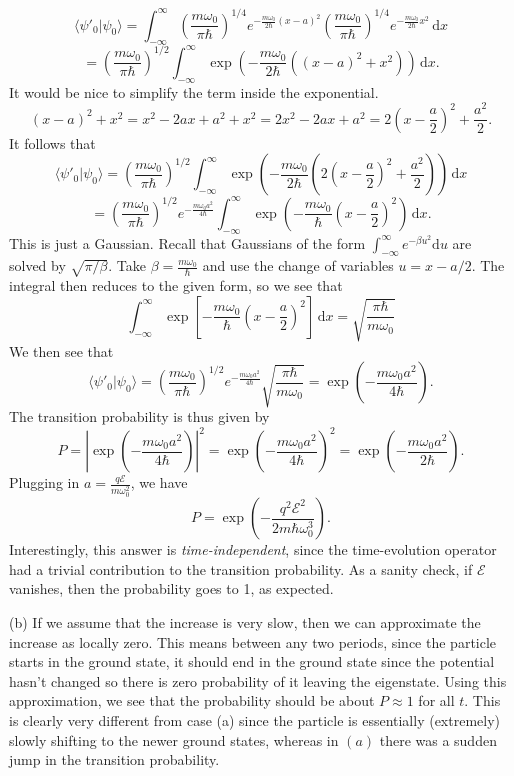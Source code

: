 \documentclass[11pt, letterpaper]{article}
\begin{document}
$$\langle \psi'_0 | \psi_0 \rangle = \int_{-\infty}^{\infty} \left(\frac{m\omega_0}{\pi\hbar}\right)^{1/4} e^{-\frac{m\omega_0}{2\hbar}(x-a)^2} \left(\frac{m\omega_0}{\pi\hbar}\right)^{1/4} e^{-\frac{m\omega_0}{2\hbar}x^2} \, \mathrm{d} x$$
$$= \left(\frac{m\omega_0}{\pi\hbar}\right)^{1/2} \int_{-\infty}^{\infty} \exp\left(-\frac{m\omega_0}{2\hbar}((x-a)^2 + x^2)\right) \, \mathrm{d} x . $$
It would be nice to simplify the term inside the exponential.
$$ (x-a)^2 + x^2 = x^2 - 2ax + a^2 + x^2 = 2x^2 - 2ax + a^2= 2\left(x - \frac{a}{2}\right)^2 + \frac{a^2}{2} .$$
It follows that
$$ \langle \psi '_0 | \psi_0 \rangle = \left(\frac{m\omega_0}{\pi\hbar}\right)^{1/2} \int_{-\infty}^{\infty} \exp\left(-\frac{m\omega_0}{2\hbar}\left(2\left(x - \frac{a}{2}\right)^2 + \frac{a^2}{2}\right)\right) \, \mathrm{d} x $$
$$= \left(\frac{m\omega_0}{\pi\hbar}\right)^{1/2} e^{-\frac{m\omega_0 a^2}{4\hbar}} \int_{-\infty}^{\infty} \exp\left(-\frac{m\omega_0}{\hbar}\left(x - \frac{a}{2}\right)^2\right) \, \mathrm{d} x  .$$
This is just a Gaussian. Recall that Gaussians of the form $\int_{-\infty}^{\infty} e^{-\beta u^2} \mathrm{d} u$ are solved by $\sqrt{\pi/\beta}$. Take $\beta = \frac{m\omega_0}{\hbar}$ and use the change of variables $u = x - a/2$. The integral then reduces to the given form, so we see that
$$ \int_{-\infty}^{\infty} \exp\left[-\frac{m\omega_0}{\hbar}\left(x - \frac{a}{2}\right)^2\right] \, \mathrm{d} x = \sqrt{\frac{\pi\hbar}{m\omega_0}} $$
We then see that
$$ \langle \psi '_0 | \psi_0 \rangle = \left(\frac{m\omega_0}{\pi\hbar}\right)^{1/2} e^{-\frac{m\omega_0 a^2}{4\hbar}} \sqrt{\frac{\pi\hbar}{m\omega_0}} = \exp\left(-\frac{m\omega_0 a^2}{4\hbar}\right).$$
The transition probability is thus given by
\[
	P=\left| \exp \left( -\frac{m\omega _0a^2}{4\hbar}  \right)  \right| ^2=\exp \left( -\frac{m\omega _0a^2}{4\hbar}  \right) ^2=\exp \left( -\frac{m\omega _0a^2}{2\hbar}  \right) 
.\]
Plugging in $a=\frac{q\mathcal{E} }{m\omega _0^2} $, we have
\[
	P=\exp \left( -\frac{q^2\mathcal{E}^2 }{2m\hbar\omega _0^3}  \right) 
.\]
Interestingly, this answer is \emph{time-independent}, since the time-evolution operator had a trivial contribution to the transition probability. As a sanity check, if $\mathcal{E} $ vanishes, then the probability goes to 1, as expected.

(b) If we assume that the increase is very slow, then we can approximate the increase as locally zero. This means between any two periods, since the particle starts in the ground state, it should end in the ground state since the potential hasn't changed so there is zero probability of it leaving the eigenstate. Using this approximation, we see that the probability should be about $P\approx 1$ for all $t$. This is clearly very different from case (a) since the particle is essentially (extremely) slowly shifting to the newer ground states, whereas in $(a)$ there was a sudden jump in the transition probability.
\end{document}
